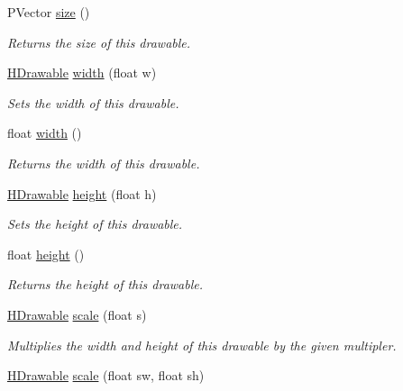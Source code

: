 \begin{DoxyCompactItemize}
P\-Vector \hyperlink{classhype_1_1core_1_1drawable_1_1_h_drawable_a91deb3e8a0b504c602670764733a744f}{size} ()
\begin{DoxyCompactList}\small\item\em Returns the size of this drawable. \end{DoxyCompactList}\item 
\hyperlink{classhype_1_1core_1_1drawable_1_1_h_drawable}{H\-Drawable} \hyperlink{classhype_1_1core_1_1drawable_1_1_h_drawable_ab77fd9fd384525f3d882a66cb7f006a5}{width} (float w)
\begin{DoxyCompactList}\small\item\em Sets the width of this drawable. \end{DoxyCompactList}\item 
float \hyperlink{classhype_1_1core_1_1drawable_1_1_h_drawable_a3c12eb4fa138e5a198ea1634cd2932ca}{width} ()
\begin{DoxyCompactList}\small\item\em Returns the width of this drawable. \end{DoxyCompactList}\item 
\hyperlink{classhype_1_1core_1_1drawable_1_1_h_drawable}{H\-Drawable} \hyperlink{classhype_1_1core_1_1drawable_1_1_h_drawable_ad361b8eaa72b4d79b0b62de0e2a2776d}{height} (float h)
\begin{DoxyCompactList}\small\item\em Sets the height of this drawable. \end{DoxyCompactList}\item 
float \hyperlink{classhype_1_1core_1_1drawable_1_1_h_drawable_a60c5ca2c8e2fc75fda7221cf4f74010b}{height} ()
\begin{DoxyCompactList}\small\item\em Returns the height of this drawable. \end{DoxyCompactList}\item 
\hyperlink{classhype_1_1core_1_1drawable_1_1_h_drawable}{H\-Drawable} \hyperlink{classhype_1_1core_1_1drawable_1_1_h_drawable_a64746f11d225482739741a694b23cea5}{scale} (float s)
\begin{DoxyCompactList}\small\item\em Multiplies the width and height of this drawable by the given multipler. \end{DoxyCompactList}\item 
\hyperlink{classhype_1_1core_1_1drawable_1_1_h_drawable}{H\-Drawable} \hyperlink{classhype_1_1core_1_1drawable_1_1_h_drawable_adac661c14251dee5d5b9237fccbb5b16}{scale} (float sw, float sh)

\end{DoxyCompactItemize}
